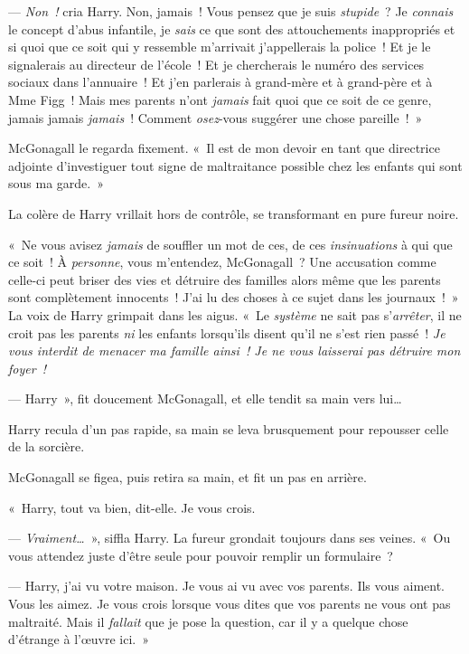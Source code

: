 --- \emph{Non~!} cria Harry. Non, jamais~! Vous pensez que je suis \emph{stupide}~?
Je \emph{connais} le concept d'abus infantile, je \emph{sais} ce que sont des attouchements inappropriés et si quoi que ce soit qui y ressemble m'arrivait j'appellerais la police~!
Et je le signalerais au directeur de l'école~!
Et je chercherais le numéro des services sociaux dans l'annuaire~!
Et j'en parlerais à grand-mère et à grand-père et à Mme Figg~!
Mais mes parents n'ont \emph{jamais} fait quoi que ce soit de ce genre, jamais jamais \emph{jamais}~!
Comment \emph{osez}-vous suggérer une chose pareille~!~»

McGonagall le regarda fixement. «~Il est de mon devoir en tant que directrice adjointe d'investiguer tout signe de maltraitance possible chez les enfants qui sont sous ma garde.~»

La colère de Harry vrillait hors de contrôle, se transformant en pure fureur noire.

«~Ne vous avisez \emph{jamais} de souffler un mot de ces, de ces \emph{insinuations} à qui que ce soit~!
À \emph{personne}, vous m'entendez, McGonagall~?
Une accusation comme celle-ci peut briser des vies et détruire des familles alors même que les parents sont complètement innocents~!
J'ai lu des choses à ce sujet dans les journaux~!~»
La voix de Harry grimpait dans les aigus.
«~Le \emph{système} ne sait pas s'\emph{arrêter}, il ne croit pas les parents \emph{ni} les enfants lorsqu'ils disent qu'il ne s'est rien passé~!
\emph{Je vous interdit de menacer ma famille ainsi~!  Je ne vous laisserai pas détruire mon foyer~!}

--- Harry~», fit doucement McGonagall, et elle tendit sa main vers lui…

Harry recula d'un pas rapide, sa main se leva brusquement pour repousser celle de la sorcière.

McGonagall se figea, puis retira sa main, et fit un pas en arrière.

«~Harry, tout va bien, dit-elle. Je vous crois.

--- \emph{Vraiment…}~», siffla Harry. La fureur grondait toujours dans ses veines.
«~Ou vous attendez juste d'être seule pour pouvoir remplir un formulaire~?

--- Harry, j'ai vu votre maison. Je vous ai vu avec vos parents. Ils vous aiment. Vous les aimez.
Je vous crois lorsque vous dites que vos parents ne vous ont pas maltraité.
Mais il \emph{fallait} que je pose la question, car il y a quelque chose d'étrange à l'œuvre ici.~»

